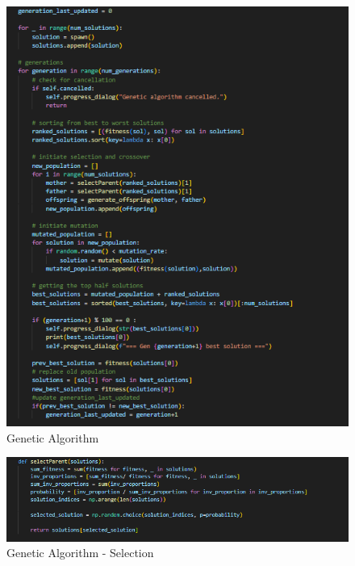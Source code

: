 \begin{appendices}
\begin{centerappendixtitle}
		\begin{figure}[h]
			\centering
			\caption{Genetic Algorithm}
			\label{genalgoCode}
			\includegraphics[width=\linewidth]{appendix/gen algo}
		\end{figure}
		
		\begin{figure}[h]
			\centering
			\caption{Genetic Algorithm - Selection}
			\label{selectionCode}
			\includegraphics[width=\linewidth]{appendix/selection}
		\end{figure}
		

\end{centerappendixtitle}
\end{appendices}
